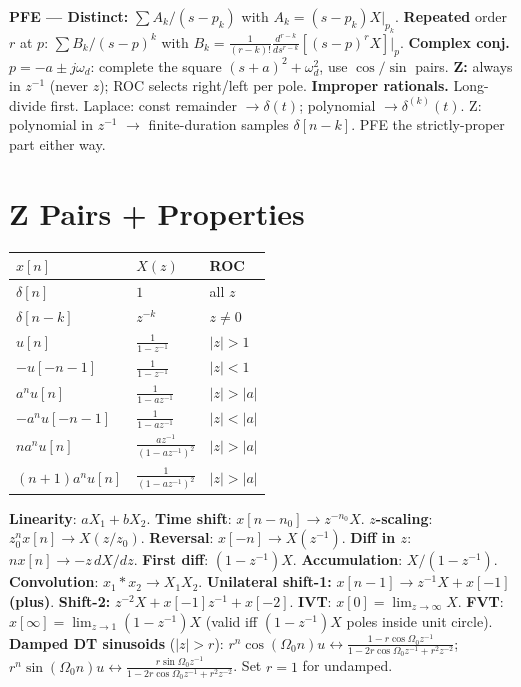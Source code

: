 \documentclass[11pt]{extarticle}
\begin{document}
\textbf{PFE --- Distinct:} $\sum A_k/(s-p_k)$ with $A_k=(s-p_k)X|_{p_k}$.
\textbf{Repeated} order $r$ at $p$: $\sum B_k/(s-p)^k$ with $B_k=\tfrac{1}{(r-k)!}\tfrac{d^{r-k}}{ds^{r-k}}[(s-p)^r X]|_p$.
\textbf{Complex conj.} $p=-a\pm j\omega_d$: complete the square $(s+a)^2+\omega_d^2$, use $\cos/\sin$ pairs.
\textbf{Z:} always in $z^{-1}$ (never $z$); ROC selects right/left per pole.
\textbf{Improper rationals.} Long-divide first. Laplace: const remainder $\to\delta(t)$; polynomial $\to\delta^{(k)}(t)$. Z: polynomial in $z^{-1}$ $\to$ finite-duration samples $\delta[n{-}k]$. PFE the strictly-proper part either way.

\FloatBarrier
\bigskip

\section*{Z Pairs + Properties}

\begin{table}
  \begin{tabular}{@{}l l l@{}}
    \toprule
    $x[n]$ & $X(z)$ & ROC \\
    \midrule
    $\delta[n]$ & $1$ & all $z$ \\
    $\delta[n{-}k]$ & $z^{-k}$ & $z\ne 0$ \\
    $u[n]$ & $\tfrac{1}{1-z^{-1}}$ & $|z|{>}1$ \\
    $-u[-n{-}1]$ & $\tfrac{1}{1-z^{-1}}$ & $|z|{<}1$ \\
    $a^n u[n]$ & $\tfrac{1}{1-az^{-1}}$ & $|z|{>}|a|$ \\
    $-a^n u[-n{-}1]$ & $\tfrac{1}{1-az^{-1}}$ & $|z|{<}|a|$ \\
    $na^n u[n]$ & $\tfrac{az^{-1}}{(1-az^{-1})^2}$ & $|z|{>}|a|$ \\
    $(n{+}1)a^n u[n]$ & $\tfrac{1}{(1-az^{-1})^2}$ & $|z|{>}|a|$ \\
    \bottomrule
  \end{tabular}
\end{table}
\textbf{Linearity}: $aX_1+bX_2$. \textbf{Time shift}: $x[n{-}n_0]\to z^{-n_0}X$. \textbf{$z$-scaling}: $z_0^n x[n]\to X(z/z_0)$. \textbf{Reversal}: $x[-n]\to X(z^{-1})$. \textbf{Diff in $z$}: $nx[n]\to -z\,dX/dz$. \textbf{First diff}: $(1-z^{-1})X$. \textbf{Accumulation}: $X/(1-z^{-1})$. \textbf{Convolution}: $x_1*x_2\to X_1X_2$.
\textbf{Unilateral shift-1:} $x[n{-}1]\to z^{-1}X+x[-1]$ \textbf{(plus)}. \textbf{Shift-2:} $z^{-2}X+x[-1]z^{-1}+x[-2]$.
\textbf{IVT}: $x[0]=\lim_{z\to\infty}X$. \textbf{FVT}: $x[\infty]=\lim_{z\to 1}(1-z^{-1})X$ (valid iff $(1-z^{-1})X$ poles inside unit circle).
\textbf{Damped DT sinusoids} ($|z|>r$): $r^n\cos(\Omega_0 n)u \leftrightarrow \tfrac{1-r\cos\Omega_0 z^{-1}}{1-2r\cos\Omega_0 z^{-1}+r^2 z^{-2}}$; $r^n\sin(\Omega_0 n)u \leftrightarrow \tfrac{r\sin\Omega_0 z^{-1}}{1-2r\cos\Omega_0 z^{-1}+r^2 z^{-2}}$. Set $r=1$ for undamped.
\end{document}
